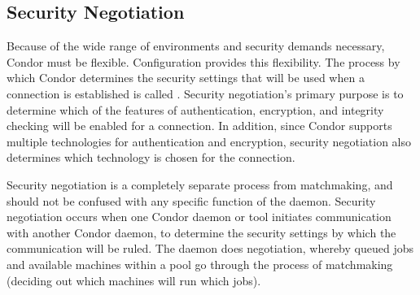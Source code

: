\subsection{\label{sec:Security-Negotiation}Security Negotiation}

Because of the wide range of environments and security demands necessary,
Condor must be flexible.
Configuration provides this flexibility.
The process by which Condor determines the security settings that will
be used when a connection is established is called
.
Security negotiation's primary purpose is to determine which
of the features of authentication, encryption, and integrity checking
will be enabled for a connection.
In addition, since Condor supports multiple
technologies for authentication and encryption,
security negotiation also
determines which technology is chosen for the connection.


Security negotiation is a completely separate process from
matchmaking, and should not be confused with any specific function of
the  daemon. 
Security negotiation occurs when one
Condor daemon or tool initiates communication with another Condor daemon,
to determine the security settings by which the communication will
be ruled.
The  daemon does negotiation,
whereby queued jobs and available machines within a pool
go through the process of matchmaking (deciding out which
machines will run which jobs).

